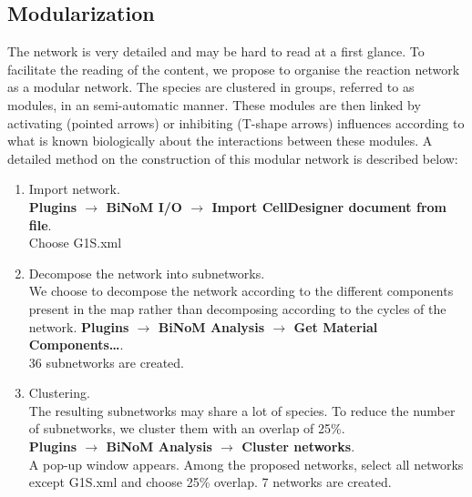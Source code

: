 \documentclass[10pt]{bmc_article}
\newenvironment{bmcformat}{\baselineskip20pt\sloppy\setboolean{publ}{false}}{\baselineskip20pt\sloppy}
\begin{document}
\begin{bmcformat}


\subsection*{Modularization} 

The network is very detailed and may be hard to read at a first glance. To facilitate the reading of the content, we propose to organise the reaction network as a modular network. The species are clustered in groups, referred to as modules, in an semi-automatic manner. These modules are then linked by activating (pointed arrows) or inhibiting (T-shape arrows) influences according to what is known biologically about the interactions between these modules. A detailed method on the construction of this modular network is described below:


\begin{enumerate}
\item Import network. \\
\textbf{Plugins $\rightarrow$ BiNoM I/O $\rightarrow$ Import CellDesigner document
from file}.  \\
Choose G1S.xml


\item	Decompose the network into subnetworks. \\
We choose to decompose the network according to the different components present in the map rather than decomposing according to the cycles of the network. 
\textbf{Plugins $\rightarrow$ BiNoM Analysis $\rightarrow$ Get Material Components…}.\\
36 subnetworks are created.

\item	Clustering. \\
The resulting subnetworks may share a lot of species. To reduce the number of subnetworks, we cluster them with an overlap of 25\%. \\
\textbf{Plugins $\rightarrow$ BiNoM Analysis $\rightarrow$ Cluster networks}. \\
A pop-up window appears. Among the proposed networks, select all networks except G1S.xml and choose 25\% overlap. 7 networks are created.


\end{enumerate}
\end{bmcformat}
\end{document}
